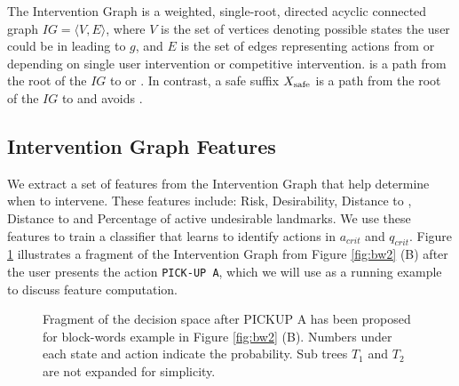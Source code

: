 The Intervention Graph is a weighted, single-root, directed acyclic connected graph $IG= \langle V,E \rangle$, where $V$ is the set of vertices denoting possible states the user could be in leading to $g$, and $E$ is the set of edges representing actions from \domainUser or \domainOther depending on single user intervention or competitive intervention.
\SuffixUnsafe is a path from the root of the $IG$ to \dandu or \undesired.
In contrast, a safe suffix $X_{\textnormal{safe}}$ is a path from the root of the $IG$ to \desired and avoids \undesired.


\subsection{Intervention Graph Features}
\label{sec:features}

We extract a set of features from the Intervention Graph that help determine when to intervene. 
These features include: Risk, Desirability, Distance to \desired, Distance to \undesired and Percentage of active undesirable landmarks.
We use these features to train a classifier that learns to identify actions in $a_{crit}$ and $q_{crit}$. 
Figure \ref{fig:feature} illustrates a fragment of the Intervention Graph from Figure \ref{fig:bw2} (B) after the user presents the action \texttt{PICK-UP A}, which we will use as a running example to discuss feature computation.

\begin{figure}[tpb]
        \caption{Fragment of the decision space after PICKUP A has been proposed for block-words example in Figure \ref{fig:bw2} (B). Numbers under each state and action indicate the probability. Sub trees $T_1$ and $T_2$ are not expanded for simplicity.}
        \label{fig:feature}
\end{figure} 

